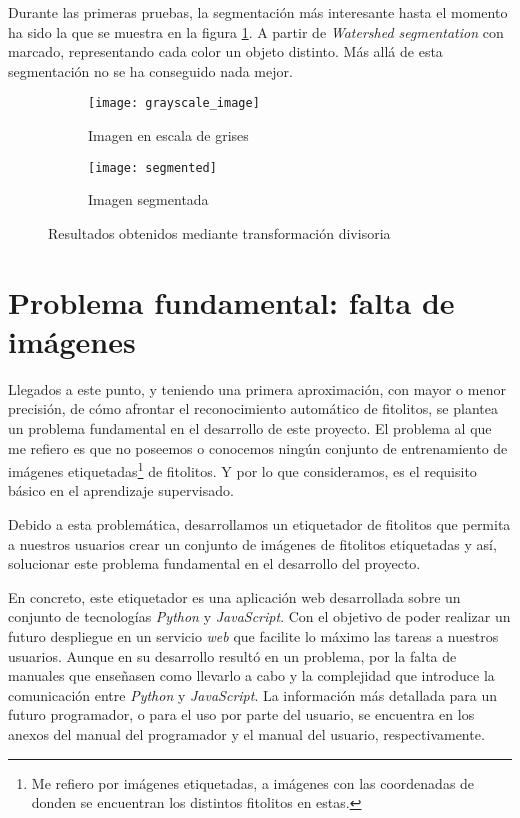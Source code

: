 Durante las primeras pruebas, la segmentación más interesante hasta el momento ha sido la que se muestra en la figura \ref{fig:5.1.3}. A partir de \textit{Watershed segmentation} con marcado, representando cada color un objeto distinto. Más allá de esta segmentación no se ha conseguido nada mejor.

\begin{figure}
	\centering
	\begin{subfigure}[b]{0.45\textwidth}
        \texttt{[image: grayscale\_image]}
        \caption{Imagen en escala de grises}
    \end{subfigure}
    \begin{subfigure}[b]{0.45\textwidth}
        \texttt{[image: segmented]}
        \caption{Imagen segmentada}
    \end{subfigure}
        \caption{Resultados obtenidos mediante transformación divisoria}
	\label{fig:5.1.3}
\end{figure} 	

\section{Problema fundamental: falta de imágenes}

Llegados a este punto, y teniendo una primera aproximación, con mayor o menor precisión, de cómo afrontar el reconocimiento automático de fitolitos, se plantea un problema fundamental en el desarrollo de este proyecto. El problema al que me refiero es que no poseemos o conocemos ningún conjunto de entrenamiento de imágenes etiquetadas\footnote{Me refiero por imágenes etiquetadas, a imágenes con las coordenadas de donden se encuentran los distintos fitolitos en estas.} de fitolitos. Y por lo que consideramos, es el requisito básico en el aprendizaje supervisado.

Debido a esta problemática, desarrollamos un etiquetador de fitolitos que permita a nuestros usuarios crear un conjunto de imágenes de fitolitos etiquetadas y así, solucionar este problema fundamental en el desarrollo del proyecto.

En concreto, este etiquetador es una aplicación web desarrollada sobre un conjunto de tecnologías \textit{Python} y \textit{JavaScript}. Con el objetivo de poder realizar un futuro despliegue en un servicio \textit{web} que facilite lo máximo las tareas a nuestros usuarios. Aunque en su desarrollo resultó en un problema, por la falta de manuales que enseñasen como llevarlo a cabo y la complejidad que introduce la comunicación entre \textit{Python} y \textit{JavaScript}. La información más detallada para un futuro programador, o para el uso por parte del usuario, se encuentra en los anexos del manual del programador y el manual del usuario, respectivamente.

